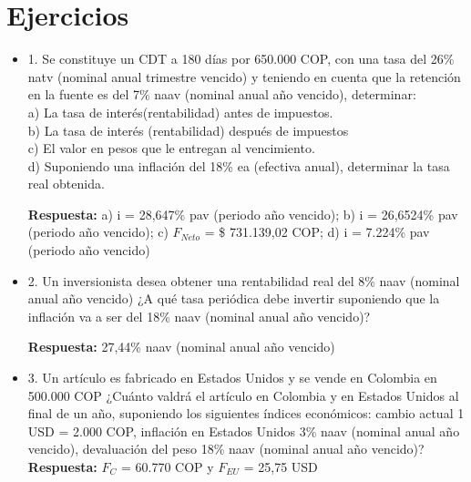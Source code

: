 

\chapter {Ejercicios}



\begin{itemize}

 \item 1. Se  constituye  un  CDT  a  180  días  por 650.000 COP,  con  una  tasa  del  26\% natv (nominal anual trimestre vencido) y teniendo  en  cuenta  que  la retención en la fuente es del 7\% naav (nominal anual año vencido), determinar:\\

       a) La tasa de interés(rentabilidad) antes de impuestos.\\
       b) La tasa de interés (rentabilidad) después de impuestos\\
       c) El valor en pesos que le entregan al vencimiento.\\
       d) Suponiendo una inflación del 18\% ea (efectiva anual), determinar la tasa real obtenida.
       
       \textbf{Respuesta:} a) i = 28,647\% pav (periodo año vencido); b) i = 26,6524\% pav (periodo año vencido); c) $F_{Neto}$ = \$ 731.139,02 COP; d) i = 7.224\% pav (periodo año vencido)\\
       \medskip

 \item 2. Un inversionista desea  obtener  una  rentabilidad  real  del  8\%  naav (nominal anual año vencido) ¿A qué tasa periódica debe invertir suponiendo que la inflación va a ser del 18\% naav (nominal anual año vencido)?

       \textbf{Respuesta:} 27,44\% naav (nominal anual año vencido)\\
       \medskip

 \item 3. Un  artículo  es  fabricado  en  Estados  Unidos  y  se  vende  en  Colombia  en 500.000 COP ¿Cuánto  valdrá  el  artículo  en  Colombia  y  en  Estados  Unidos  al final  de  un  año,  suponiendo  los  siguientes  índices  económicos: cambio actual 1 USD =  2.000 COP, inflación en Estados Unidos 3\% naav (nominal anual año vencido), devaluación del peso 18\% naav (nominal anual año vencido)?\\
       \textbf{Respuesta:} $F_{C}$ =  60.770 COP y $F_{EU}$ =  25,75 USD\\
       \medskip


\end{itemize}
